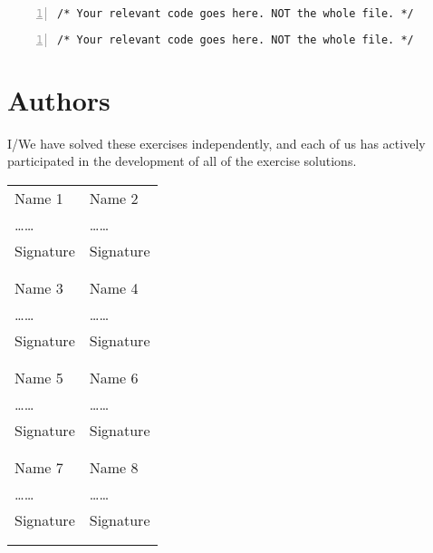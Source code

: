 \documentclass{article}
\begin{document}
\begin{lstlisting}[basicstyle=\small\sffamily,
keywords={break,case,const,continue,default,else,enum,
for,if,return,switch,while,do,long,void,int,float,double,
char,struct,typedef,include,size\_t},
keywordstyle={\color{blue}},
comment={[l]{//}}, morecomment={[s]{/*}{*/}}, commentstyle=\itshape,
columns={[l]flexible}, numbers=left, numberstyle=\tiny,
frameround=fftt, frame=shadowbox, captionpos=b,
caption={Matrix inversion with semaphores.},
label=LST:invmat1]
/* Your relevant code goes here. NOT the whole file. */
\end{lstlisting}

\begin{lstlisting}[basicstyle=\small\sffamily,
keywords={break,case,const,continue,default,else,enum,
for,if,return,switch,while,do,long,void,int,float,double,
char,struct,typedef,include,size\_t},
keywordstyle={\color{blue}},
comment={[l]{//}}, morecomment={[s]{/*}{*/}}, commentstyle=\itshape,
columns={[l]flexible}, numbers=left, numberstyle=\tiny,
frameround=fftt, frame=shadowbox, captionpos=b,
caption={Matrix inversion with barriers.},
label=LST:invmat2]
/* Your relevant code goes here. NOT the whole file. */
\end{lstlisting}


\newpage
\section{Authors}
I/We have solved these exercises independently, and each of us has actively
participated in the development of all of the exercise solutions.
\vspace{1cm}

\noindent
\begin{tabular}{p{70mm}p{70mm}}

%
%

Name 1 & Name 2 \\
\dots\dotfill\dots & \dots\dotfill\dots \\
Signature & Signature \\
& \\
& \\

Name 3 & Name 4 \\
\dots\dotfill\dots & \dots\dotfill\dots \\
Signature & Signature \\
& \\
& \\

Name 5 & Name 6 \\
\dots\dotfill\dots & \dots\dotfill\dots \\
Signature & Signature \\
& \\
& \\

Name 7 & Name 8 \\
\dots\dotfill\dots & \dots\dotfill\dots \\
Signature & Signature \\
& \\
& \\
\end{tabular}
\end{document}
